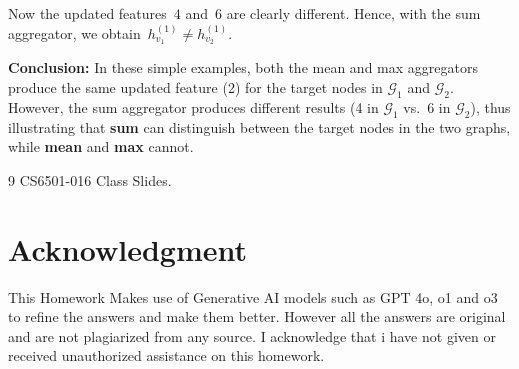 \documentclass[a4paper,12pt]{article}
\begin{document}
Now the updated features \(\,4\) and \(\,6\) are clearly different. Hence, with 
the sum aggregator, we obtain \(\,h^{(1)}_{v_1} \neq h^{(1)}_{v_2}\).

\bigskip

\textbf{Conclusion:} In these simple examples, both the mean and max aggregators 
produce the same updated feature (2) for the target nodes in \(\mathcal{G}_1\) and 
\(\mathcal{G}_2\). However, the sum aggregator produces different results (4 in 
\(\mathcal{G}_1\) vs.\ 6 in \(\mathcal{G}_2\)), thus illustrating that \textbf{sum} 
can distinguish between the target nodes in the two graphs, while \textbf{mean} 
and \textbf{max} cannot.







\begin{thebibliography}{9}
  CS6501-016 Class Slides.
\end{thebibliography}





\section*{Acknowledgment}
This Homework Makes use of Generative AI models such as GPT 4o, o1 and o3 to refine the answers and make them better. However all the answers are original and are not plagiarized from any source. I acknowledge that i have not given or received unauthorized assistance on this homework.
\end{document}
